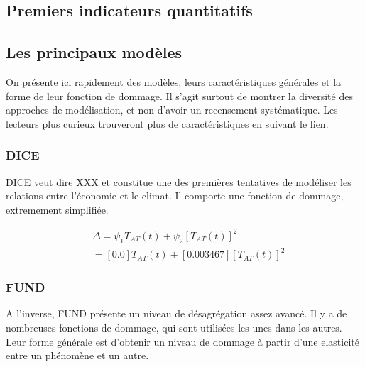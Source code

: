 \subsection{Premiers indicateurs quantitatifs}

\begin{figure}
    \centering
    \label{fig:enter-label}
\end{figure}

\subsection{Les principaux modèles}

On présente ici rapidement des modèles, leurs caractéristiques générales et la forme de leur fonction de dommage. Il s'agit surtout de montrer la diversité des approches de modélisation, et non d'avoir un recensement systématique. Les lecteurs plus curieux trouveront plus de caractéristiques en suivant le lien. 

\subsubsection{DICE}

DICE veut dire XXX et constitue une des premières tentatives de modéliser les relations entre l'économie et le climat. Il comporte une fonction de dommage, extremement simplifiée. 

\begin{equation}
\begin{array}{ll}
    & \displaystyle  \Delta = \psi_{1}T_{AT}(t) + \psi_{2}[T_{AT}(t)]^{2} \\
    & = [0.0]T_{AT}(t) + [0.003467][T_{AT}(t)]^{2}
\end{array}
\label{eq:df_dice2023}
\end{equation}

\subsubsection{FUND} 

A l'inverse, FUND présente un niveau de désagrégation assez avancé. Il y a de nombreuses fonctions de dommage, qui sont utilisées les unes dans les autres. Leur forme générale est d'obtenir un niveau de dommage à partir d'une elasticité entre un phénomène et un autre. 

